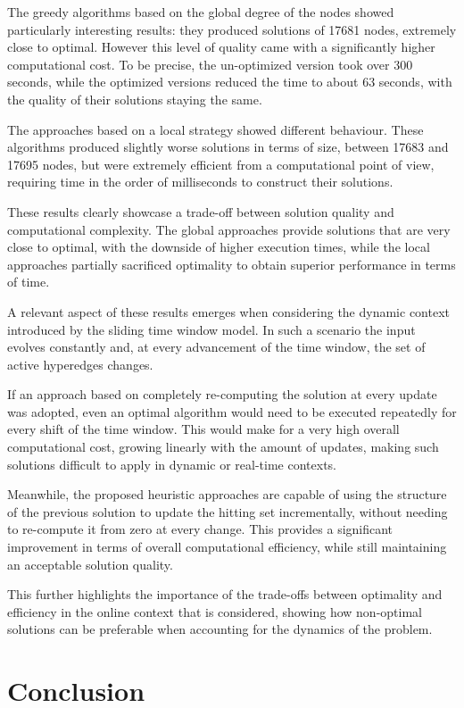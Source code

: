\documentclass[11pt]{article}
\begin{document}
The greedy algorithms based on the global degree of the nodes showed particularly interesting results: they produced solutions of 17681 nodes, extremely close to optimal. However this level of quality came with a significantly higher computational cost. To be precise, the un-optimized version took over 300 seconds, while the optimized versions reduced the time to about 63 seconds, with the quality of their solutions staying the same.

The approaches based on a local strategy showed different behaviour. These algorithms produced slightly worse solutions in terms of size, between 17683 and 17695 nodes, but were extremely efficient from a computational point of view, requiring time in the order of milliseconds to construct their solutions.

These results clearly showcase a trade-off between solution quality and computational complexity. The global approaches provide solutions that are very close to optimal, with the downside of higher execution times, while the local approaches partially sacrificed optimality to obtain superior performance in terms of time.

A relevant aspect of these results emerges when considering the dynamic context introduced by the sliding time window model. In such a scenario the input evolves constantly and, at every advancement of the time window, the set of active hyperedges changes.

If an approach based on completely re-computing the solution at every update was adopted, even an optimal algorithm would need to be executed repeatedly for every shift of the time window. This would make for a very high overall computational cost, growing linearly with the amount of updates, making such solutions difficult to apply in dynamic or real-time contexts.

Meanwhile, the proposed heuristic approaches are capable of using the structure of the previous solution to update the hitting set incrementally, without needing to re-compute it from zero at every change. This provides a significant improvement in terms of overall computational efficiency, while still maintaining an acceptable solution quality.

This further highlights the importance of the trade-offs between optimality and efficiency in the online context that is considered, showing how non-optimal solutions can be preferable when accounting for the dynamics of the problem.

\section{Conclusion}
\end{document}
